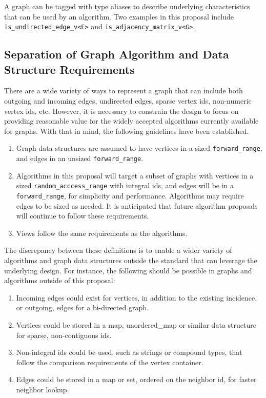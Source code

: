 \documentclass[10pt,onecolumn]{article}
\begin{document}
A graph can be tagged with type aliases to describe underlying characteristics that can be used by an algorithm. Two examples
in this proposal include \texttt{is\_undirected\_edge\_v<E>} and \texttt{is\_adjacency\_matrix\_v<G>}.

\subsection{Separation of Graph Algorithm and Data Structure Requirements}

There are a wide variety of ways to represent a graph that can include both outgoing and incoming edges, undirected edges,
sparse vertex ids, non-numeric vertex ids, etc. However, it is necessary to constrain the design to focus on providing reasonable 
value for the widely accepted algorithms currently available for graphs. With that in mind, the following guidelines have been established.
\begin{enumerate}
\item Graph data structures are assumed to have vertices in a sized \texttt{forward\_range}, and edges in an unsized \texttt{forward\_range}.
\item Algorithms in this proposal will target a subset of graphs with vertices in a sized \texttt{random\_acccess\_range} with 
integral ids, and edges will be in a \texttt{forward\_range}, for simplicity and performance. Algorithms may require edges to be sized as
needed. It is anticipated that future algorithm proposals will continue to follow these requirements.
\item Views follow the same requirements as the algorithms.
\end{enumerate}

The discrepancy between these definitions is to enable a wider variety of algorithms and graph data structures outside the standard that 
can leverage the underlying design. For instance, the following should be possible in graphs and algorithms outside of this proposal:

\begin{enumerate}
\item Incoming edges could exist for vertices, in addition to the existing incidence, or outgoing, edges for a bi-directed graph.
\item Vertices could be stored in a map, unordered\_map or similar data structure for sparse, non-contiguous ids.
\item Non-integral ids could be used, such as strings or compound types, that follow the comparison requirements of the vertex container.
\item Edges could be stored in a map or set, ordered on the neighbor id, for faster neighbor lookup.
\end{enumerate}
\end{document}
